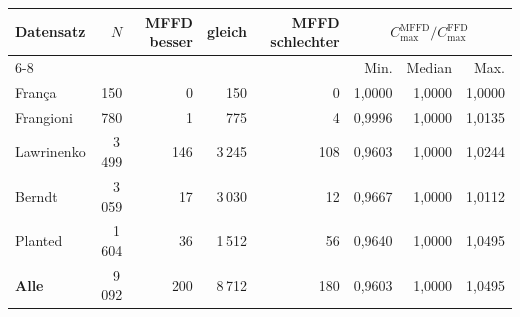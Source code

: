 \begin{tabular}{l r r r r r r r}
\toprule
Datensatz & $N$ & MFFD besser & gleich & MFFD schlechter & \multicolumn{3}{c}{$C^{\mathrm{MFFD}}_{\max}/C^{\mathrm{FFD}}_{\max}$} \\
\cmidrule(lr){6-8}
 & & & & & Min. & Median & Max. \\
\midrule
França & 150 & 0 & 150 & 0 & 1{,}0000 & 1{,}0000 & 1{,}0000 \\
Frangioni & 780 & 1 & 775 & 4 & 0{,}9996 & 1{,}0000 & 1{,}0135 \\
Lawrinenko & 3\,499 & 146 & 3\,245 & 108 & 0{,}9603 & 1{,}0000 & 1{,}0244 \\
Berndt & 3\,059 & 17 & 3\,030 & 12 & 0{,}9667 & 1{,}0000 & 1{,}0112 \\
Planted & 1\,604 & 36 & 1\,512 & 56 & 0{,}9640 & 1{,}0000 & 1{,}0495 \\
\midrule
\textbf{Alle} & 9\,092 & 200 & 8\,712 & 180 & 0{,}9603 & 1{,}0000 & 1{,}0495 \\
\bottomrule
\end{tabular}
